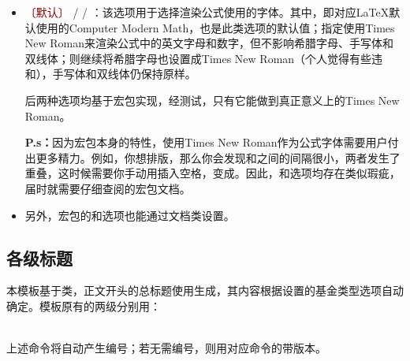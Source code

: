 \documentclass[QingNianC, vlined, timesmathnogreek]{nsfc}
\begin{document}
\begin{itemize}
\begin{itemize}
			\item {}\textcolor{DarkRed}{〔默认〕} /  / ：该选项用于选择渲染公式使用的字体。其中，即对应LaTeX默认使用的Computer Modern Math，也是此类选项的默认值；指定使用Times New Roman来渲染公式中的英文字母和数字，但不影响希腊字母、手写体和双线体；则继续将希腊字母也设置成Times New Roman（个人觉得有些违和），手写体和双线体仍保持原样。
			
			后两种选项均基于\href{https://mirrors.pku.edu.cn/ctan/macros/xetex/latex/mathspec/mathspec.pdf}{\ttfamily\color{DarkRed}}宏包实现，经测试，只有它能做到真正意义上的Times New Roman。

			\textbf{P.s：}因为\href{https://mirrors.pku.edu.cn/ctan/macros/xetex/latex/mathspec/mathspec.pdf}{\ttfamily\color{DarkRed}}宏包本身的特性，使用Times New Roman作为公式字体需要用户付出更多精力。例如，你想排版，那么你会发现和之间的间隔很小，两者发生了重叠，这时候需要你手动用插入空格，变成。因此，和选项均存在类似瑕疵，届时就需要仔细查阅\href{https://mirrors.pku.edu.cn/ctan/macros/xetex/latex/mathspec/mathspec.pdf}{\ttfamily\color{DarkRed}}的宏包文档。

			\item 另外，\href{https://mirrors.sustech.edu.cn/CTAN/macros/latex/contrib/algorithm2e/doc/algorithm2e.pdf}{\ttfamily\color{DarkRed}}宏包的和选项也能通过文档类设置。
		\end{itemize}
	\end{itemize}
	
	\subsection{各级标题}
	
	本模板基于类，正文开头的总标题使用生成，其内容根据设置的基金类型选项自动确定。模板原有的两级分别用：\par
	\par
	\\
	上述命令将自动产生编号；若无需编号，则用对应命令的带\shad{*}版本。
	
\end{document}
